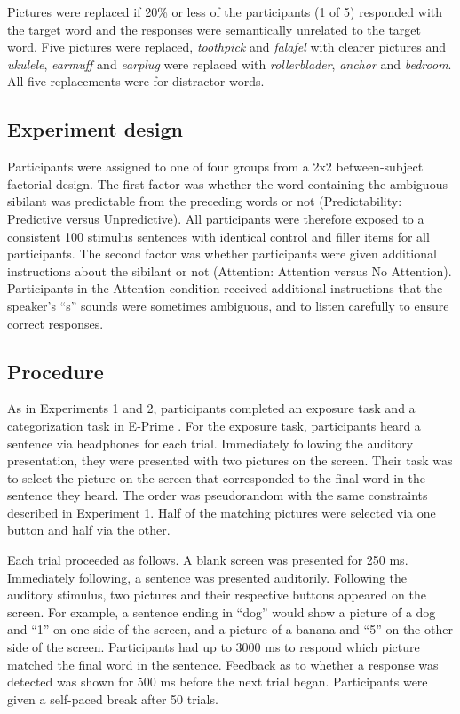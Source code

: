 Pictures were replaced if 20\% or less of the participants (1 of 5) responded with the target word and the responses were semantically unrelated to the target word. 
Five pictures were replaced, \emph{toothpick} and \emph{falafel} with clearer pictures and \emph{ukulele}, \emph{earmuff} and \emph{earplug} were replaced with \emph{rollerblader}, \emph{anchor} and \emph{bedroom}.  
All five replacements were for distractor words.

\subsection{Experiment design}

Participants were assigned to one of four groups from a 2x2 between-subject factorial design.
The first factor was whether the word containing the ambiguous sibilant was predictable from the preceding words or not  (Predictability: Predictive versus Unpredictive).
All participants were therefore exposed to a consistent 100 stimulus sentences with identical control and filler items for all participants.
The second factor was whether participants were given additional instructions about the sibilant or not (Attention: Attention versus No Attention).
Participants in the Attention condition received additional instructions that the speaker's ``s'' sounds were sometimes ambiguous, and to listen carefully to ensure correct responses.

\subsection{Procedure}

As in Experiments 1 and 2, participants completed an exposure task and a categorization task in E-Prime \citep{PsychologySoftwareTools2012}.  
For the exposure task, participants heard a sentence via headphones for each trial.  
Immediately following the auditory presentation, they were presented with two pictures on the screen.  
Their task was to select the picture on the screen that corresponded to the final word in the sentence they heard.  
The order was pseudorandom with the same constraints described in Experiment 1.
Half of the matching pictures were selected via one button and half via the other.

Each trial proceeded as follows.
A blank screen was presented for 250 ms.
Immediately following, a sentence was presented auditorily.
Following the auditory stimulus, two pictures and their respective buttons appeared on the screen.
For example, a sentence ending in ``dog'' would show a picture of a dog and ``1'' on one side of the screen, and a picture of a banana and ``5'' on the other side of the screen.
Participants had up to 3000 ms to respond which picture matched the final word in the sentence.
Feedback as to whether a response was detected was shown for 500 ms before the next trial began.
Participants were given a self-paced break after 50 trials.

